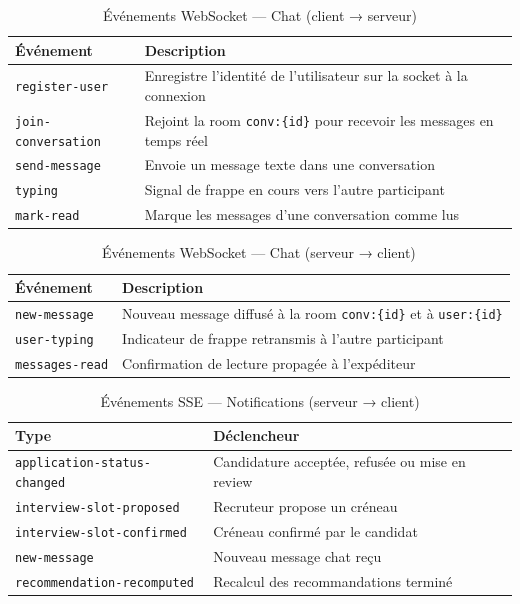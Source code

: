 ﻿\documentclass[12pt,a4paper]{report}
\begin{document}
\begin{table}[H]
\centering
\begin{tabular}{ll}
\toprule
\textbf{Événement} & \textbf{Description} \\
\midrule
\texttt{register-user} & Enregistre l'identité de l'utilisateur sur la socket à la connexion \\
\texttt{join-conversation} & Rejoint la room \texttt{conv:\{id\}} pour recevoir les messages en temps réel \\
\texttt{send-message} & Envoie un message texte dans une conversation \\
\texttt{typing} & Signal de frappe en cours vers l'autre participant \\
\texttt{mark-read} & Marque les messages d'une conversation comme lus \\
\bottomrule
\end{tabular}
\caption{Événements WebSocket — Chat (client → serveur)}
\end{table}

\begin{table}[H]
\centering
\begin{tabular}{ll}
\toprule
\textbf{Événement} & \textbf{Description} \\
\midrule
\texttt{new-message} & Nouveau message diffusé à la room \texttt{conv:\{id\}} et à \texttt{user:\{id\}} \\
\texttt{user-typing} & Indicateur de frappe retransmis à l'autre participant \\
\texttt{messages-read} & Confirmation de lecture propagée à l'expéditeur \\
\bottomrule
\end{tabular}
\caption{Événements WebSocket — Chat (serveur → client)}
\end{table}

\begin{table}[H]
\centering
\begin{tabular}{ll}
\toprule
\textbf{Type} & \textbf{Déclencheur} \\
\midrule
\texttt{application-status-changed} & Candidature acceptée, refusée ou mise en review \\
\texttt{interview-slot-proposed} & Recruteur propose un créneau \\
\texttt{interview-slot-confirmed} & Créneau confirmé par le candidat \\
\texttt{new-message} & Nouveau message chat reçu \\
\texttt{recommendation-recomputed} & Recalcul des recommandations terminé \\
\bottomrule
\end{tabular}
\caption{Événements SSE — Notifications (serveur → client)}
\end{table}
\end{document}
